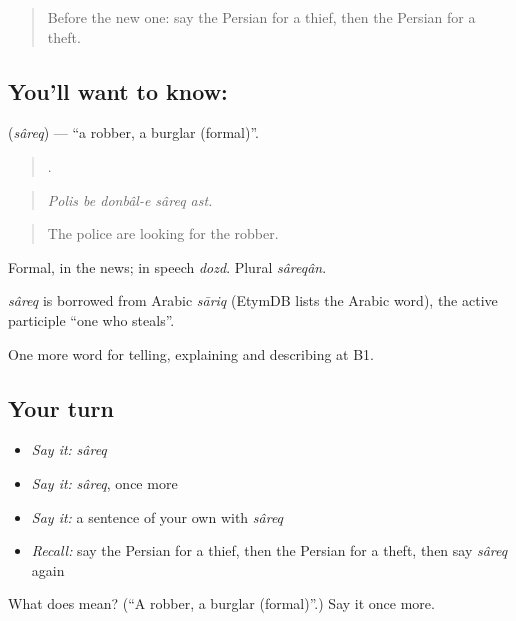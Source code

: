 \begin{quote}
Before the new one: say the Persian for a thief, then the Persian for a theft.
\end{quote}

\subsection*{You'll want to know: }
\textbf{} (\emph{sâreq}) — \textquotedblleft{}a robber, a burglar (formal)\textquotedblright{}.

\begin{quote}
    .
\end{quote}

\begin{quote}
\emph{Polis be donbâl-e sâreq ast.}
\end{quote}

\begin{quote}
The police are looking for the robber.
\end{quote}

Formal, in the news; in speech \emph{dozd}. Plural \emph{sâreqân}.

\begin{cousinweb}
\emph{sâreq} is borrowed from Arabic \emph{sāriq} (EtymDB lists the Arabic word), the active participle \textquotedblleft{}one who steals\textquotedblright{}.
\end{cousinweb}

\begin{grammarlens}[title={What you've built}]
One more word for telling, explaining and describing at B1.
\end{grammarlens}

\subsection*{Your turn}
\begin{itemize}
\raggedright
  \item \emph{Say it:} \emph{sâreq}
  \item \emph{Say it:} \emph{sâreq}, once more
  \item \emph{Say it:} a sentence of your own with \emph{sâreq}
  \item \emph{Recall:} say the Persian for a thief, then the Persian for a theft, then say \emph{sâreq} again
\end{itemize}

\begin{tcolorbox}[breakable,colback=teal!4,colframe=teal!35!black,title={Before you move on}]
What does  mean? (\textquotedblleft{}A robber, a burglar (formal)\textquotedblright{}.) Say it once more.
\end{tcolorbox}
